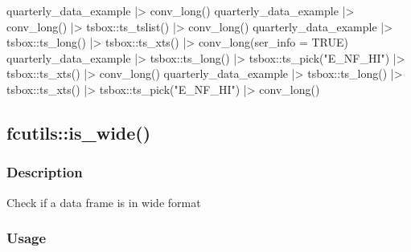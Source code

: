 \documentclass[
  letterpaper,
  DIV=11,
  numbers=noendperiod]{scrreport}
\newenvironment{Shaded}{\begin{snugshade}}{\end{snugshade}}
\newcommand{\AttributeTok}[1]{\textcolor[rgb]{0.40,0.45,0.13}{#1}}
\newcommand{\ConstantTok}[1]{\textcolor[rgb]{0.56,0.35,0.01}{#1}}
\newcommand{\FunctionTok}[1]{\textcolor[rgb]{0.28,0.35,0.67}{#1}}
\newcommand{\NormalTok}[1]{\textcolor[rgb]{0.00,0.23,0.31}{#1}}
\newcommand{\SpecialCharTok}[1]{\textcolor[rgb]{0.37,0.37,0.37}{#1}}
\newcommand{\StringTok}[1]{\textcolor[rgb]{0.13,0.47,0.30}{#1}}
\begin{document}
\begin{Shaded}
\begin{Highlighting}[]
\NormalTok{quarterly\_data\_example }\SpecialCharTok{|\textgreater{}}
  \FunctionTok{conv\_long}\NormalTok{()}
\NormalTok{quarterly\_data\_example }\SpecialCharTok{|\textgreater{}}
  \FunctionTok{conv\_long}\NormalTok{() }\SpecialCharTok{|\textgreater{}}
\NormalTok{  tsbox}\SpecialCharTok{::}\FunctionTok{ts\_tslist}\NormalTok{() }\SpecialCharTok{|\textgreater{}}
  \FunctionTok{conv\_long}\NormalTok{()}
\NormalTok{quarterly\_data\_example }\SpecialCharTok{|\textgreater{}}
\NormalTok{  tsbox}\SpecialCharTok{::}\FunctionTok{ts\_long}\NormalTok{() }\SpecialCharTok{|\textgreater{}}
\NormalTok{  tsbox}\SpecialCharTok{::}\FunctionTok{ts\_xts}\NormalTok{() }\SpecialCharTok{|\textgreater{}}
  \FunctionTok{conv\_long}\NormalTok{(}\AttributeTok{ser\_info =} \ConstantTok{TRUE}\NormalTok{)}
\NormalTok{quarterly\_data\_example }\SpecialCharTok{|\textgreater{}}
\NormalTok{  tsbox}\SpecialCharTok{::}\FunctionTok{ts\_long}\NormalTok{() }\SpecialCharTok{|\textgreater{}}
\NormalTok{  tsbox}\SpecialCharTok{::}\FunctionTok{ts\_pick}\NormalTok{(}\StringTok{"E\_NF\_HI"}\NormalTok{) }\SpecialCharTok{|\textgreater{}}
\NormalTok{  tsbox}\SpecialCharTok{::}\FunctionTok{ts\_xts}\NormalTok{() }\SpecialCharTok{|\textgreater{}}
  \FunctionTok{conv\_long}\NormalTok{()}
\NormalTok{quarterly\_data\_example }\SpecialCharTok{|\textgreater{}}
\NormalTok{  tsbox}\SpecialCharTok{::}\FunctionTok{ts\_long}\NormalTok{() }\SpecialCharTok{|\textgreater{}}
\NormalTok{  tsbox}\SpecialCharTok{::}\FunctionTok{ts\_xts}\NormalTok{() }\SpecialCharTok{|\textgreater{}}
\NormalTok{  tsbox}\SpecialCharTok{::}\FunctionTok{ts\_pick}\NormalTok{(}\StringTok{"E\_NF\_HI"}\NormalTok{) }\SpecialCharTok{|\textgreater{}}
  \FunctionTok{conv\_long}\NormalTok{()}
\end{Highlighting}
\end{Shaded}

\subsection{fcutils::is\_wide()}\label{fcutilsis_wide}

\subsubsection{Description}\label{description-53}

Check if a data frame is in wide format

\subsubsection{Usage}\label{usage-53}
\end{document}
